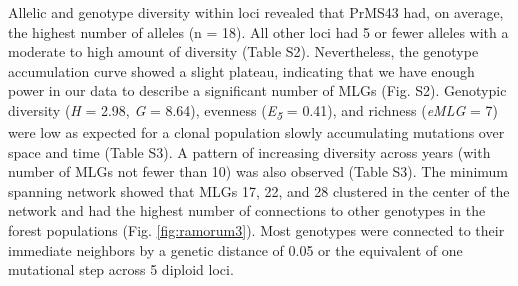 \documentclass[double,12pt]{beavtex}
\begin{document}
  Allelic and genotype diversity within loci revealed that PrMS43 had, on
  average, the highest number of alleles (n = 18). All other loci had 5 or
  fewer alleles with a moderate to high amount of diversity (Table S2).
  Nevertheless, the genotype accumulation curve showed a slight plateau,
  indicating that we have enough power in our data to describe a
  significant number of MLGs (Fig. S2). Genotypic diversity (\emph{H} =
  2.98, \emph{G} = 8.64), evenness (\emph{E\textsubscript{5}} = 0.41), and
  richness (\emph{eMLG} = 7) were low as expected for a clonal population
  slowly accumulating mutations over space and time (Table S3). A pattern
  of increasing diversity across years (with number of MLGs not fewer than
  10) was also observed (Table S3). The minimum spanning network showed
  that MLGs 17, 22, and 28 clustered in the center of the network and had
  the highest number of connections to other genotypes in the forest
  populations (Fig. \ref{fig:ramorum3}). Most genotypes were connected to
  their immediate neighbors by a genetic distance of 0.05 or the
  equivalent of one mutational step across 5 diploid loci.
  
\end{document}
